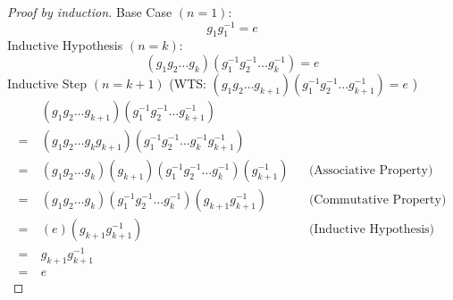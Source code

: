 \documentclass[12pt]{article}
\begin{document}
\begin{enumerate}
        \begin{proof}[Proof by induction]
          Base Case $(n = 1)$:
          \[g_{1}g_{1}^{-1} = e\]
          Inductive Hypothesis $(n = k)$:
          \[(g_{1}g_{2} \dots g_{k})(g_{1}^{-1}g_{2}^{-1} \dots g_{k}^{-1}) = e \]
          Inductive Step $(n = k + 1)$ \quad (WTS: \((g_{1}g_{2} \dots g_{k + 1})(g_{1}^{-1}g_{2}^{-1} \dots g_{k + 1}^{-1}) = e \) )
          \begin{align*}
          &\ (g_{1}g_{2} \dots g_{k + 1})(g_{1}^{-1}g_{2}^{-1} \dots g_{k + 1}^{-1}) \\
          =&\  (g_{1}g_{2} \dots g_{k}g_{k+1})(g_{1}^{-1}g_{2}^{-1} \dots g_{k}^{-1}g_{k+1}^{-1}) \\
          =&\ (g_{1}g_{2} \dots g_{k})(g_{k+1})(g_{1}^{-1}g_{2}^{-1} \dots g_{k}^{-1})(g_{k+1}^{-1}) && \text{(Associative Property)}\\
          =&\ (g_{1}g_{2} \dots g_{k})(g_{1}^{-1}g_{2}^{-1} \dots g_{k}^{-1})(g_{k+1}g_{k+1}^{-1}) && \text{(Commutative Property)} \\
          =&\ (e) (g_{k+1}g_{k+1}^{-1}) &&\text{(Inductive Hypothesis)} \\
          =&\ g_{k+1}g_{k+1}^{-1} \\
          =&\ e
          \end{align*}
        \end{proof}
\end{enumerate}
\end{document}
